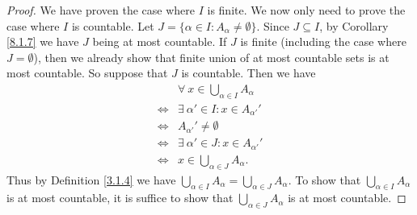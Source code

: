 \begin{proof}
    We have proven the case where \(I\) is finite.
    We now only need to prove the case where \(I\) is countable.
    Let \(J = \{\alpha \in I : A_{\alpha} \neq \emptyset\}\).
    Since \(J \subseteq I\), by Corollary \ref{8.1.7} we have \(J\) being at most countable.
    If \(J\) is finite (including the case where \(J = \emptyset\)), then we already show that finite union of at most countable sets is at most countable.
    So suppose that \(J\) is countable.
    Then we have
    \begin{align*}
             & \forall\ x \in \bigcup_{\alpha \in I} A_{\alpha} \\
        \iff & \exists\ \alpha' \in I : x \in A_{\alpha'}'      \\
        \iff & A_{\alpha'}' \neq \emptyset                      \\
        \iff & \exists\ \alpha' \in J : x \in A_{\alpha'}'      \\
        \iff & x \in \bigcup_{\alpha \in J} A_{\alpha}.
    \end{align*}
    Thus by Definition \ref{3.1.4} we have \(\bigcup_{\alpha \in I} A_{\alpha} = \bigcup_{\alpha \in J} A_{\alpha}\).
    To show that \(\bigcup_{\alpha \in I} A_{\alpha}\) is at most countable, it is suffice to show that \(\bigcup_{\alpha \in J} A_{\alpha}\) is at most countable.


\end{proof}
